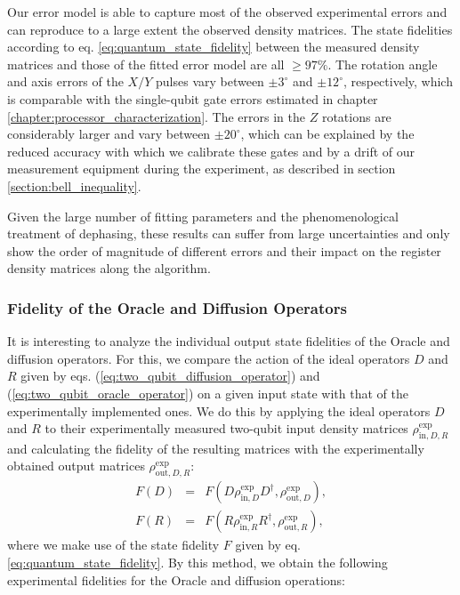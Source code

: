 Our error model is able to capture most of the observed experimental errors and can reproduce to a large extent the observed density matrices. The state fidelities according to eq. \ref{eq:quantum_state_fidelity} between the measured density matrices and those of the fitted error model are all $\ge 97\%$. The rotation angle and axis errors of the $X/Y$ pulses vary between $\pm3^\circ$ and $\pm 12^\circ$, respectively, which is comparable with the single-qubit gate errors estimated in chapter \ref{chapter:processor_characterization}. The errors in the $Z$ rotations are considerably larger and vary between $\pm 20^\circ$, which can be explained by the reduced accuracy with which we calibrate these gates and by a drift of our measurement equipment during the experiment, as described in section \ref{section:bell_inequality}.

\smallskip

Given the large number of fitting parameters and the phenomenological treatment of dephasing, these results can suffer from large uncertainties and only show the order of magnitude of different errors and their impact on the register density matrices along the algorithm.

\subsubsection{Fidelity of the Oracle and Diffusion Operators}

It is interesting to analyze the individual output state fidelities of the Oracle and diffusion operators. For this, we compare the action of the ideal operators $D$ and $R$ given by eqs. (\ref{eq:two_qubit_diffusion_operator}) and (\ref{eq:two_qubit_oracle_operator}) on a given input state with that of the experimentally implemented ones. We do this by applying the ideal operators $D$ and $R$ to their experimentally measured two-qubit input density matrices $\rho^\mathrm{exp}_{\mathrm{in},D,R}$ and calculating the fidelity of the resulting matrices with the experimentally obtained output matrices $\rho_{\mathrm{out},D,R}^\mathrm{exp}$:
%
\begin{eqnarray}
F(D) & = & F(D\rho_{\mathrm{in},D}^\mathrm{exp}D^{\dagger},\rho_{\mathrm{out},D}^\mathrm{exp}), \label{eq:grover_diffusion_fidelity} \\
F(R) & = & F(R\rho_{\mathrm{in},R}^\mathrm{exp}R^{\dagger},\rho_{\mathrm{out},R}^\mathrm{exp}), \label{eq:grover_oracle_fidelity}
\end{eqnarray}
%
where we make use of the state fidelity $F$ given by eq. \ref{eq:quantum_state_fidelity}. By this method, we obtain the following experimental fidelities for the Oracle and diffusion operations:

